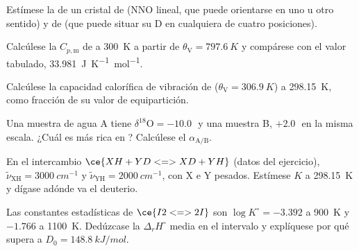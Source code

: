 \begin{exercise}[$\star\star$]\label{exo:b3:statistical-thermo-applied:6}
Estímese la  de un cristal de  (NNO lineal, que puede
orientarse en uno u otro sentido) y de  (que puede situar su D en cualquiera de cuatro
posiciones).
\end{exercise}

\begin{exercise}[$\star\star$]\label{exo:b3:statistical-thermo-applied:7}
Calcúlese la $C_{p,\mathrm m}$ de  a \qty{300}{K} a partir de $\theta_{\mathrm V} = \qty{797.6}{K}$ y compárese con el
valor tabulado, \qty{33.981}{J.K^{-1}.mol^{-1}}.
\end{exercise}

\begin{exercise}[$\star\star$]\label{exo:b3:statistical-thermo-applied:8}
Calcúlese la capacidad calorífica de vibración de  ($\theta_{\mathrm V} = \qty{306.9}{K}$) a
\qty{298.15}{K}, como fracción de su valor de equipartición.
\end{exercise}

\begin{exercise}[$\star\star$]\label{exo:b3:statistical-thermo-applied:9}
Una muestra de agua A tiene $\delta^{18}\mathrm O = -10.0$\,\textperthousand\ y una muestra B,
$+2.0$\,\textperthousand\ en la misma escala. ¿Cuál es más rica en ? Calcúlese el
 $\alpha_{\mathrm{A/B}}$.
\end{exercise}

\begin{exercise}[$\star\star\star$]\label{exo:b3:statistical-thermo-applied:10}
En el intercambio $\ce{XH + YD <=> XD + YH}$ (datos del ejercicio), $\tilde\nu_{\mathrm{XH}} =
\qty{3000}{cm^{-1}}$ y $\tilde\nu_{\mathrm{YH}} = \qty{2000}{cm^{-1}}$, con X e Y pesados. Estímese $K$ a
\qty{298.15}{K} y dígase adónde va el deuterio.
\end{exercise}

\begin{exercise}[$\star\star\star$]\label{exo:b3:statistical-thermo-applied:11}
Las constantes estadísticas de $\ce{I2 <=> 2 I}$ son $\log K^\circ = -3.392$ a \qty{900}{K} y
$-1.766$ a \qty{1100}{K}. Dedúzcase la $\Delta_rH^\circ$ media en el intervalo y explíquese
por qué supera a $D_0 = \qty{148.8}{kJ/mol}$.
\end{exercise}

